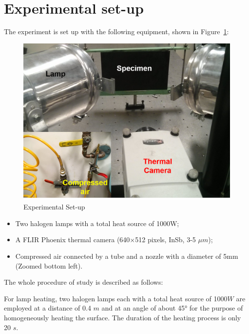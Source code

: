\documentclass{tQRT2e}
\begin{document}
\section{Experimental set-up}
The experiment is set up with the following equipment, shown in Figure~\ref{Exp}:
\begin{figure}
	\centering
	\includegraphics[scale=0.5]{Exp}
	\caption{Experimental Set-up}
	\label{Exp}
\end{figure}

\begin{itemize}
  \item Two halogen lamps with a total heat source of 1000W;
  \item A FLIR Phoenix thermal camera (640×512 pixels, InSb, 3-5 $\mu m$);
  \item Compressed air connected by a tube and a nozzle with a diameter of 5mm (Zoomed bottom left).
\end{itemize}

The whole procedure of study is described as follows:  

For lamp heating, two halogen lamps each with a total heat source of 1000$ W $ are employed at a distance of 0.4 $ m $ and at an angle of about 45° for the purpose of homogeneously heating the surface. The duration of the heating process is only 20 $ s $.   
\end{document}

